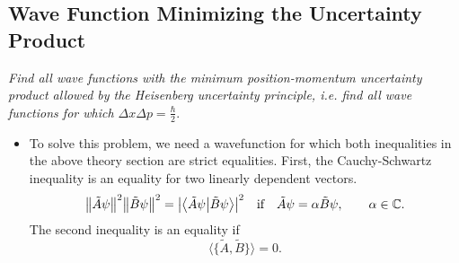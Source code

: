 \documentclass[11pt, a4paper]{article}
\newcommand{\bbraket}[2]{\big \langle {#1} \big | {#2} \big \rangle}  %
\begin{document}
\subsection{Wave Function Minimizing the Uncertainty Product}
\textit{Find all wave functions with the minimum position-momentum uncertainty product allowed by the Heisenberg uncertainty principle, i.e. find all wave functions for which $ \Delta x \Delta p = \frac{\hbar}{2} $}.
\begin{itemize}
	\item To solve this problem, we need a wavefunction for which both inequalities in the above theory section are strict equalities. First, the Cauchy-Schwartz inequality is an equality for two linearly dependent vectors.
	\begin{equation*}
		\norm{\tilde{A}\psi}^{2}\norm{\tilde{B}\psi}^{2} = \abs{\bbraket{\tilde{A}\psi}{\tilde{B}\psi}}^{2} \quad \text{if} \quad \tilde{A}\psi = \alpha \tilde{B}\psi, \qquad \alpha \in \mathbb{C}.
	\end{equation*}
	The second inequality is an equality if 
	\begin{equation*}
		\big\langle \big\{\tilde{A}, \tilde{B}\big\} \big\rangle = 0.
	\end{equation*}
	

\end{itemize}
\end{document}
